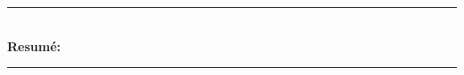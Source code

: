 \cleardoublepage
{} %
\begin{vcentrepage}
\noindent\rule[2pt]{\textwidth}{0.2pt}\\

{\large\textbf{Resumé:}\\}


\noindent\rule[2pt]{\textwidth}{0.8pt}
\end{vcentrepage}

\restoregeometry

